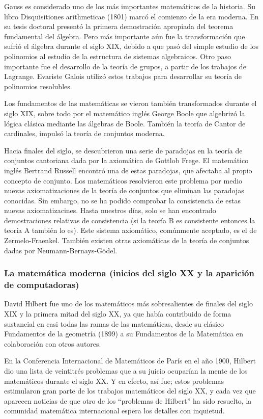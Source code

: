 Gauss es considerado uno de los más importantes matemáticos de la historia. Su libro Disquisitiones arithmeticae (1801) marcó el comienzo de la era moderna. En su tesis doctoral presentó la primera demostración apropiada del teorema fundamental del álgebra. Pero más importante aún fue la transformación que sufrió el álgebra durante el siglo XIX, debido a que pasó del simple
estudio de los polinomios al estudio de la estructura de sistemas algebraicos. Otro paso importante fue el desarrollo de la teoría de grupos, a partir de los trabajos de Lagrange. Evariste Galois utilizó estos trabajos para desarrollar su teoría de polinomios resolubles.

Los fundamentos de las matemáticas se vieron también transformados durante el siglo XIX, sobre todo por el matemático inglés George Boole que algebrizó la lógica clásica mediante las álgebras de Boole. También la teoría de Cantor de cardinales, impulsó la teoría de conjuntos moderna. 

Hacia finales del siglo, se descubrieron una serie de paradojas en la teoría de conjuntos cantoriana dada por la axiomática de Gottlob Frege. El matemático inglés Bertrand Russell encontró una de estas paradojas, que afectaba al propio concepto de conjunto. Los matemáticos resolvieron este problema por medio nuevas axiomatizaciones de la teoría de conjuntos que eliminan las paradojas conocidas. Sin embargo, no se ha podido comprobar la consistencia de estas nuevas axiomatizacines. Hasta nuestros días, solo se han encontrado demostraciones relativas de consistencia (si la teoría B es consistente entonces la teoría A también lo es). Este sistema axiomático, comúnmente aceptado, es el de Zermelo-Fraenkel. También existen otras axiomáticas de la teoría de conjuntos dadas por Neumann-Bernays-Gödel. 


\subsubsection*{La matemática moderna (inicios del siglo XX y la aparición de computadoras)}

David Hilbert fue uno de los matemáticos más sobresalientes de finales del siglo XIX y la primera mitad del siglo XX, ya que había contribuido de forma sustancial en casi todas las ramas
de las matemáticas, desde su clásico Fundamentos de la geometría (1899) a su Fundamentos de la Matemática en colaboración con otros autores. 

En la Conferencia Internacional de Matemáticos de París en el año 1900, Hilbert dio una lista de veintitrés problemas que a su juicio ocuparían la mente de los matemáticos durante el siglo XX. Y en efecto, así fue; estos problemas estimularon gran parte de los trabajos matemáticos del siglo XX, y cada vez que aparecen noticias de que otro de los “problemas de Hilbert” ha sido resuelto, la comunidad matemática internacional espera los detalles con inquietud. 

